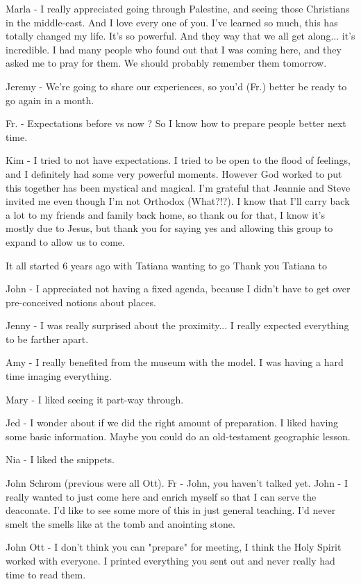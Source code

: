 \documentclass[letterpaper]{report}
\begin{document}
Marla - I really appreciated going through Palestine, and seeing those Christians in the middle-east. And I love every one of you. I've learned so much, this has totally changed my life. It's so powerful. And they way that we all get along... it's incredible. I had many people who found out that I was coming here, and  they asked me to pray for them.  We should probably remember them tomorrow.

Jeremy - We're going to share our experiences, so you'd (Fr.) better be ready to go again in a month.

Fr. - Expectations before vs now ?  So I know how to prepare people better next time.

Kim - I tried to not have expectations.  I tried to be open to the flood of feelings, and I definitely had some very powerful moments.  However God worked to put this together has been mystical and magical.  I'm grateful that Jeannie and Steve invited me even though I'm not Orthodox (What?!?).  I know that I'll carry back a lot to my friends and family back home, so thank ou for that, I know it's mostly due to Jesus, but thank you for saying yes and allowing this group to expand to allow us to come.

It all started 6 years ago with Tatiana wanting to go
  Thank you Tatiana to 

John - I appreciated not having a fixed agenda, because I didn't have to get over pre-conceived notions about places.

Jenny - I was really surprised about the proximity... I really expected everything to be farther apart.

Amy - I really benefited from the museum with the model.  I was having a hard time imaging everything.

Mary - I liked seeing it part-way through.

Jed - I wonder about if we did the right amount of preparation. I liked having some basic information.  Maybe you could do an old-testament geographic lesson.

Nia - I liked the snippets.

John Schrom (previous were all Ott).
Fr - John, you haven't talked yet.
John - I really wanted to just come here and enrich myself so that I can serve the deaconate.
I'd like to see some more of this in just general teaching.
I'd never smelt the smells like at the tomb and anointing stone.

John Ott - I don't think you can "prepare" for  meeting, I think the Holy Spirit worked with everyone. I printed everything you sent out and never really had time to read them.
\end{document}
